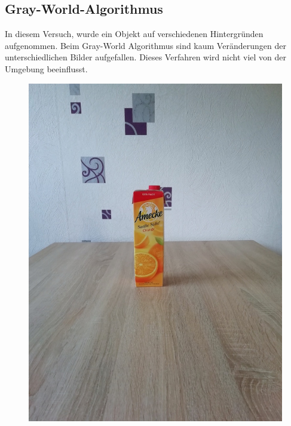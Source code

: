\begin{appendices}
\section*{Gray-World-Algorithmus}
In diesem Versuch, wurde ein Objekt auf verschiedenen Hintergründen aufgenommen. Beim Gray-World Algorithmus sind kaum Veränderungen der unterschiedlichen Bilder aufgefallen. Dieses Verfahren wird nicht viel von der Umgebung beeinflusst.
\begin{figure}[htb]
\begin{minipage}[c]{0.2\textwidth}
\includegraphics[width=\textwidth]{Sources/Bild1_GW.jpg}
\end{minipage}
\hfill
\begin{minipage}[c]{0.08\textwidth}

\end{minipage}
\end{figure}
\end{appendices}
